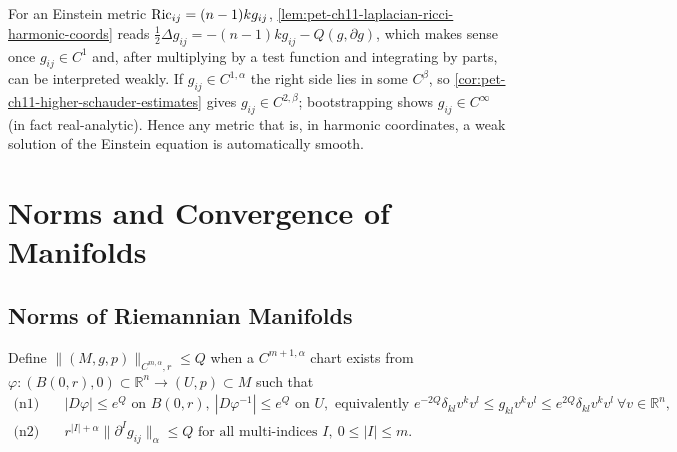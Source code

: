 \begin{remark}
  \label{rem:pet-ch11-einstein-harmonic-regularity-bootstrap}
  For an Einstein metric $\operatorname{Ric}_{ij}=(n-1)kg_{ij}$,
  \cref{lem:pet-ch11-laplacian-ricci-harmonic-coords} reads
  $\tfrac12\Delta g_{ij}=-(n-1)kg_{ij}-Q(g,\partial g)$, which makes sense
  once $g_{ij}\in C^1$ and, after multiplying by a test function and
  integrating by parts, can be interpreted weakly. If $g_{ij}\in C^{1,\alpha}$
  the right side lies in some $C^\beta$, so \cref{cor:pet-ch11-higher-schauder-estimates}
  gives $g_{ij}\in C^{2,\beta}$; bootstrapping shows $g_{ij}\in C^\infty$
  (in fact real-analytic). Hence any metric that is, in harmonic coordinates,
  a weak solution of the Einstein equation is automatically smooth.
\end{remark}

\section{Norms and Convergence of Manifolds}

\subsection{Norms of Riemannian Manifolds}

\begin{definition}
  \label{def:pet-ch11-cmalpha-norm-pointed}
  Define $\|(M,g,p)\|_{C^{m,\alpha},r}\le Q$ when a $C^{m+1,\alpha}$ chart
  exists from $\varphi:(B(0,r),0)\subset\mathbb{R}^n\to(U,p)\subset M$ such
  that
  \begin{align}
    \text{(n1)}\quad&|D\varphi|\le e^Q\text{ on }B(0,r),\ |D\varphi^{-1}|\le e^Q\text{ on }U,
    \text{ equivalently }e^{-2Q}\delta_{kl}v^kv^l\le g_{kl}v^kv^l\le e^{2Q}\delta_{kl}v^kv^l\ \forall v\in\mathbb{R}^n,\\
    \text{(n2)}\quad&r^{|I|+\alpha}\|\partial^Ig_{ij}\|_\alpha\le Q\text{ for all multi-indices }I,\ 0\le|I|\le m.
  \end{align}
\end{definition}

